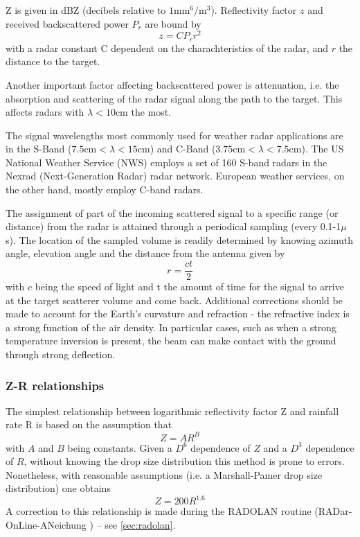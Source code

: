 Z is given in dBZ (decibels relative to $1\text{mm}^6/\text{m}^3$).
Reflectivity factor $z$ and received backscattered power $P_r$ are bound by
\begin{equation}
    z = C P_r r^2
\end{equation}
with a radar constant C dependent on the charachteristics of the radar, and $r$ the distance to the target.

Another important factor affecting backscattered power is attenuation, i.e. the absorption and scattering of the radar signal along the path to the target. This affects radars with $\lambda < 10\text{cm}$ the most. 

The signal wavelengths most commonly used for weather radar applications are in the S-Band ($7.5\text{cm} < \lambda < 15\text{cm}$) and C-Band ($3.75\text{cm} < \lambda < 7.5\text{cm}$). The US National Weather Service (NWS) employs a set of 160 S-band radars in the Nexrad (Next-Generation Radar) radar network. European weather services, on the other hand, mostly employ C-band radars.

The assignment of part of the incoming scattered signal to a specific range (or distance) from the radar is attained through a periodical sampling (every 0.1-1$\mu$s). The location of the sampled volume is readily determined by knowing azimuth angle, elevation angle and the distance from the antenna given by
\begin{equation}
    r = \dfrac{ct}{2}
\end{equation}
with $c$ being the speed of light and t the amount of time for the signal to arrive at the target scatterer volume and come back. Additional corrections should be made to account for the Earth's curvature and refraction - the refractive index is a strong function of the air density. In particular cases, such as when a strong temperature inversion is present, the beam can make contact with the ground through strong deflection.
\subsubsection{Z-R relationships}
The simplest relationship between logarithmic reflectivity factor Z and rainfall rate R is based on the assumption that
\begin{equation} \label{eq:zr}
    Z = A R^B
\end{equation}
with $A$ and $B$ being constants. Given a $D^6$ dependence of $Z$ and a $D^3$ dependence of $R$, without knowing the drop size distribution this method is prone to errors. Nonetheless, with reasonable assumptions (i.e. a Marshall-Pamer drop size distribution) one obtains 
\begin{equation}
    Z = 200 R ^{1.6}
\end{equation}
A correction to this relationship is made during the RADOLAN routine (RADar-OnLine-ANeichung \citet{DeutscherWetterdienst2022RADOLANANeichung}) -- see \cref{sec:radolan}. 

